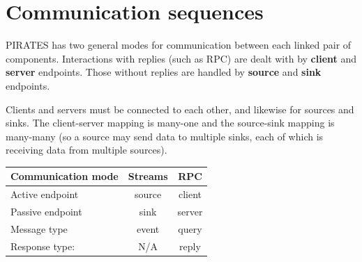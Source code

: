 \documentclass[12pt,a4paper,twoside]{article}
\renewcommand{\_}{\texttt{\symbol{95}}}
\begin{document}
\section{Communication sequences}

PIRATES has two general modes for communication between each linked
pair of components. Interactions with replies (such as RPC) are
dealt with by \textbf{client} and \textbf{server} endpoints.
Those without replies
are handled by \textbf{source} and \textbf{sink} endpoints.

Clients and servers must be connected to each other, and likewise
for sources and sinks. The client-server mapping is many-one and
the source-sink mapping is many-many (so a source may send
data to multiple sinks, each of which is receiving data from multiple
sources).



\begin{center}
\begin{tabular}{|l|c|c|}
\hline
\textbf{Communication mode} \rule[-2mm]{0mm}{6.5mm} &
\textbf{Streams} & \textbf{RPC}\\
\hline
Active endpoint \rule[0mm]{0mm}{4.5mm} & source & client\\
Passive endpoint & sink & server\\
Message type & event & query\\
Response type: \rule[-2mm]{0mm}{2mm} & N/A & reply\\
\hline
\end{tabular}
\end{center}
\vspace{2mm}
\end{document}
